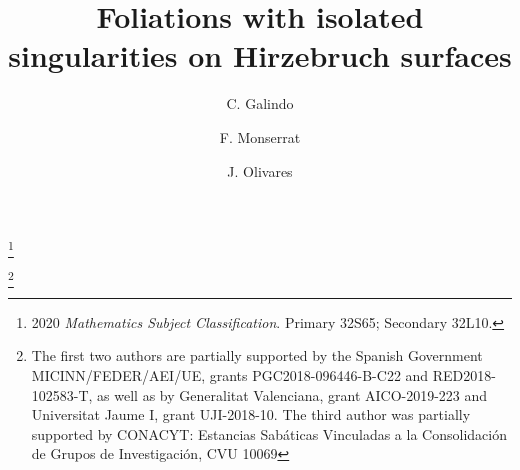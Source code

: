 \documentclass{amsart} %
\theoremstyle{definition}
\begin{document}
 \begin{center}


 \end{center}
\title {Foliations with isolated singularities on Hirzebruch surfaces}
\author{C. Galindo}
\address{Institut Universitari de Matemàtiques i Aplicacions de Castelló (IMAC) and
         Departament de Matemàtiques, Universitat Jaume I, Edifici TI (ESTCE),
         Av. de Vicent Sos Baynat, s/n, Campus del Riu Sec, 12071 Castelló de la Plana, Spain}
\thanks{2020 \textit{Mathematics Subject Classification}.
        Primary 32S65; Secondary 32L10.}
\author{F. Monserrat}
\address{Instituto Universitario de Matemática Pura y Aplicada,
         Universidad Politécnica de Valencia, Edificio 8E, acceso F, 4a Planta,
         Camino de Vera, s/n, 46022 Valencia, Spain}
\author{J. Olivares}
\address{Centro de Investigaci\'on en Matem\'aticas, A.C.
A.P. 402, Guanajuato 36000, Mexico.} 
\thanks{The first two authors are partially supported by the Spanish Government
MICINN/FEDER/AEI/UE, grants  PGC2018-096446-B-C22 and  RED2018-102583-T, as well
as by Generalitat Valenciana, grant AICO-2019-223 and Universitat Jaume I, grant UJI-2018-10.
The third author was partially supported by CONACYT: Estancias Sabáticas Vinculadas a la
Consolidación de Grupos de Investigación, CVU 10069}
\end{document}
